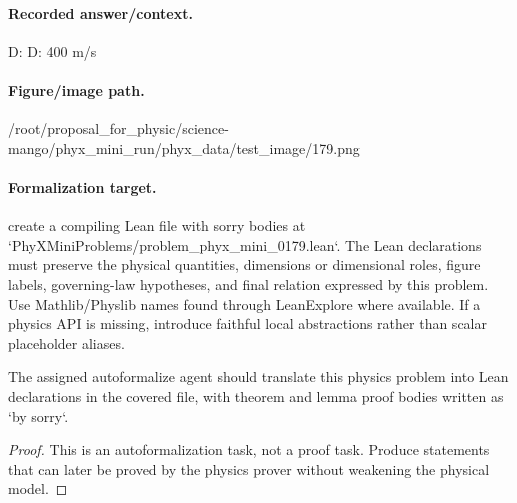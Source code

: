 \paragraph{Recorded answer/context.}
D: D: 400 m/s

\paragraph{Figure/image path.}
/root/proposal\_for\_physic/science-mango/phyx\_mini\_run/phyx\_data/test\_image/179.png

\paragraph{Formalization target.}
create a compiling Lean file with sorry bodies at `PhyXMiniProblems/problem\_phyx\_mini\_0179.lean`. The Lean declarations must preserve the physical quantities, dimensions or dimensional roles, figure labels, governing-law hypotheses, and final relation expressed by this problem.
Use Mathlib/Physlib names found through LeanExplore where available. If a physics API is missing, introduce faithful local abstractions rather than scalar placeholder aliases.

\begin{theorem}
\label{thm:physics:phyx_mini_0179:target}
The assigned autoformalize agent should translate this physics problem into Lean declarations in the covered file, with theorem and lemma proof bodies written as `by sorry`.
\end{theorem}
\begin{proof}
This is an autoformalization task, not a proof task. Produce statements that can later be proved by the physics prover without weakening the physical model.
\end{proof}

